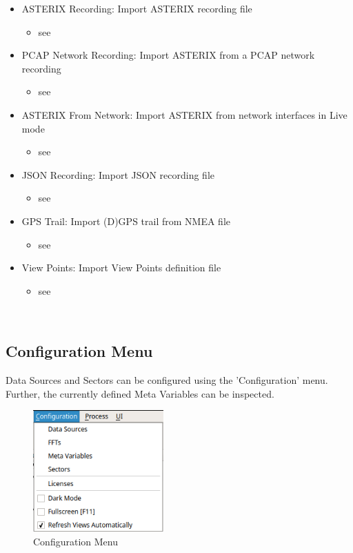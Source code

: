 \begin{itemize}
 \item ASTERIX Recording: Import ASTERIX recording file
 \begin{itemize}
 \item see 
 \end{itemize}
 \item PCAP Network Recording: Import ASTERIX from a PCAP network recording
  \begin{itemize}
 \item see 
 \end{itemize}
 \item ASTERIX From Network: Import ASTERIX from network interfaces in Live mode
  \begin{itemize}
 \item see 
 \end{itemize}
 \item JSON Recording: Import JSON recording file
  \begin{itemize}
 \item see 
 \end{itemize}
 \item GPS Trail: Import (D)GPS trail from NMEA file
  \begin{itemize}
 \item see 
 \end{itemize}
 \item View Points: Import View Points definition file
  \begin{itemize}
 \item see 
 \end{itemize}
\end{itemize}
\  \\

\subsection{Configuration Menu}
\label{sec:ui_overview_config_menu}

Data Sources and Sectors can be configured using the 'Configuration' menu. Further, the currently defined Meta Variables can be inspected.

\begin{figure}[H]
  \center
    \includegraphics[width=5cm,frame]{figures/ui_configuration_menu.png}
  \caption{Configuration Menu}
\end{figure}

